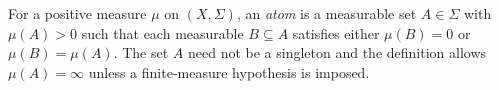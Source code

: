 
For a positive measure $\mu$ on $(X,\Sigma)$, an \emph{atom} is a measurable set $A\in\Sigma$ with $\mu(A)>0$ such that each measurable $B\subseteq A$ satisfies either $\mu(B)=0$ or $\mu(B)=\mu(A)$. The set $A$ need not be a singleton and the definition allows $\mu(A)=\infty$ unless a finite-measure hypothesis is imposed.
